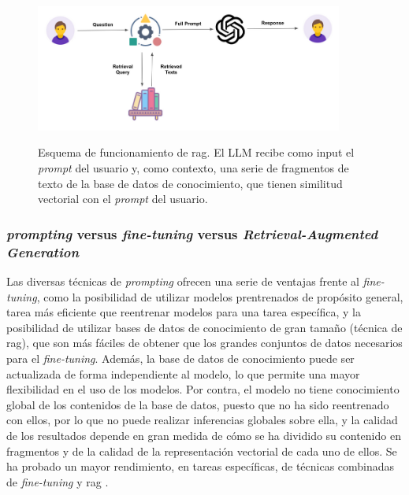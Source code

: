 \begin{figure}[H]
    \caption[Esquema de funcionamiento de RAG]{Esquema de funcionamiento de \gls{rag}. El LLM recibe como input el \textit{prompt} del usuario y, como contexto, una serie de fragmentos de texto de la base de datos de conocimiento, que tienen similitud vectorial con el \textit{prompt} del usuario.}
    \centering
    \includegraphics[width=0.9\textwidth]{./figuras/rag.png}
    \label{fig:rag}
\end{figure}


\subsubsection{\textit{prompting} versus \textit{fine-tuning} versus \textit{Retrieval-Augmented Generation}}

Las diversas técnicas de \textit{prompting} ofrecen una serie de ventajas frente al \textit{fine-tuning}, como la posibilidad de utilizar modelos prentrenados de propósito general, tarea más eficiente que reentrenar modelos para una tarea específica, y la posibilidad de utilizar bases de datos de conocimiento de gran tamaño (técnica de \gls{rag}), que son más fáciles de obtener que los grandes conjuntos de datos necesarios para el \textit{fine-tuning}. Además, la base de datos de conocimiento puede ser actualizada de forma independiente al modelo, lo que permite una mayor flexibilidad en el uso de los modelos. Por contra, el modelo  no tiene conocimiento global de los contenidos de la base de datos, puesto que no ha sido reentrenado con ellos, por lo que no puede realizar inferencias globales sobre ella, y la calidad de los resultados depende en gran medida de cómo se ha dividido su contenido en fragmentos y de la calidad de la representación vectorial de cada uno de ellos. Se ha probado un mayor rendimiento, en tareas específicas, de técnicas combinadas de \textit{fine-tuning} y \gls{rag} \citep{lewisRetrievalAugmentedGenerationKnowledgeIntensive2021}.


